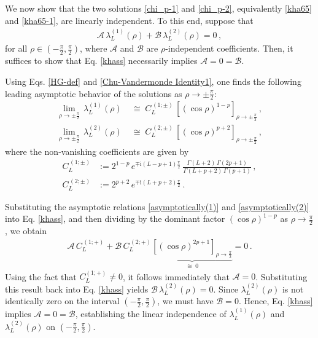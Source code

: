 \documentclass[aps,twocolumn,nofootinbib]{revtex4}
\begin{document}
{\begin{appendix}
We now show that the two solutions \eqref{chi_p-1} and \eqref{chi_p-2}, equivalently \eqref{kha65} and \eqref{kha65-1}, are linearly independent. To this end, suppose that
\begin{align}\label{khass}
   \mathcal{A}\,\lambda_L^{(1)}(\rho) + \mathcal{B}\,\lambda_L^{(2)}(\rho) = 0 \,,
\end{align}
for all $\rho\in\left(-\tfrac{\pi}{2},\tfrac{\pi}{2}\right)$, where $\mathcal{A}$ and $\mathcal{B}$ are $\rho$-independent coefficients. Then, it suffices to show that Eq. \eqref{khass} necessarily implies $\mathcal{A}=0=\mathcal{B}$.

Using Eqs. \eqref{HG-def} and \eqref{Chu-Vandermonde Identity1}, one finds the following leading asymptotic behavior of the solutions as $\rho\longrightarrow\pm\tfrac{\pi}{2}$:
\begin{align}
    \lim_{\rho\longrightarrow\pm\tfrac{\pi}{2}} \, \lambda_L^{(1)}(\rho) &\;\cong\; C_L^{\,(1;\pm)}\,\left[(\cos\rho)^{1-p}\right]_{\rho\longrightarrow\pm\tfrac{\pi}{2}}\,, \label{asymptotically(1)}\\[3pt]
    \lim_{\rho\longrightarrow\pm\tfrac{\pi}{2}} \,\lambda_L^{(2)}(\rho) &\;\cong\; C_L^{\,(2;\pm)}\,\left[(\cos\rho)^{p+2}\right]_{\rho\longrightarrow\pm\tfrac{\pi}{2}} \,, \label{asymptotically(2)}
\end{align}
where the non-vanishing coefficients are given by
\begin{align}
     C_L^{\,(1;\pm)} &:= 2^{1-p}\,e^{\mp\mathrm{i}(L-p+1)\frac{\pi}{2}}\,
    \frac{\Gamma(L+2)\,\Gamma(2p+1)}{\Gamma(L+p+2)\,\Gamma(p+1)}\,,\\[3pt]
    C_L^{\,(2;\pm)} &:= 2^{p+2}\,e^{\mp\mathrm{i}(L+p+2)\frac{\pi}{2}}\,.
\end{align}

Substituting the asymptotic relations \eqref{asymptotically(1)} and \eqref{asymptotically(2)} into Eq. \eqref{khass}, and then dividing by the dominant factor $(\cos\rho)^{1-p}$ as $\rho\longrightarrow\tfrac{\pi}{2}$, we obtain
\begin{align}\label{lin-in}
    \mathcal{A}\,C_L^{\,(1;+)} + \mathcal{B}\,C_L^{\,(2;+)} \underbrace{\left[(\cos\rho)^{2p+1}\right]_{\rho\longrightarrow\tfrac{\pi}{2}}}_{\cong\; 0} = 0 \,.
\end{align}
Using the fact that $C_L^{(1;+)}\neq 0$, it follows immediately that $\mathcal{A}=0$. Substituting this result back into Eq. \eqref{khass} yields $\mathcal{B}\,\lambda_L^{(2)}(\rho)=0$. Since $\lambda_L^{(2)}(\rho)$ is not identically zero on the interval $\left(-\tfrac{\pi}{2},\tfrac{\pi}{2}\right)$, we must have $\mathcal{B}=0$. Hence, Eq. \eqref{khass} implies $\mathcal{A}=0=\mathcal{B}$, establishing the linear independence of $\lambda_L^{(1)}(\rho)$ and $\lambda_L^{(2)}(\rho)$ on $\left(-\tfrac{\pi}{2},\tfrac{\pi}{2}\right)$.



\end{appendix}}
\end{document}
